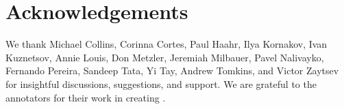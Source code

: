 \section*{Acknowledgements}
We thank Michael Collins, Corinna Cortes, Paul Haahr, Ilya Kornakov, Ivan Kuznetsov, Annie Louis, Don Metzler, Jeremiah Milbauer, Pavel Nalivayko, Fernando Pereira, Sandeep Tata, Yi Tay, Andrew Tomkins, and Victor Zaytsev for insightful discussions, suggestions, and support. We are grateful to the annotators for their work in creating \datasetname.